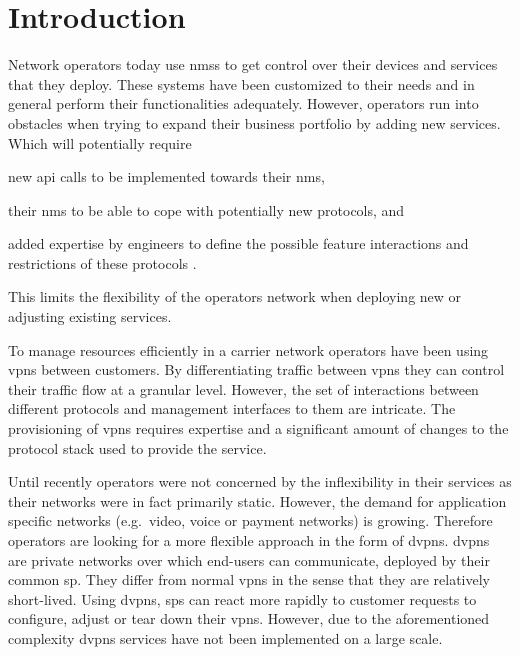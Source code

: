 \section{Introduction} %
\label{sec:introduction}
Network operators today use \acp{nms} to get control over their devices and services that they deploy. These systems have been customized to their needs and in general perform their functionalities adequately. However, operators run into obstacles when trying to expand their business portfolio by adding new services. Which will potentially require
\begin{inparaenum}
	\item new \ac{api} calls to be implemented towards their \ac{nms}, 
	\item their \ac{nms} to be able to cope with potentially new protocols, and
	\item added expertise by engineers to define the possible feature interactions and restrictions of these protocols \cite{programmability-answer}. 
\end{inparaenum}
This limits the flexibility of the operators network when deploying new or adjusting existing services.



To manage resources efficiently in a carrier network operators have been using \acp{vpn} between customers. By differentiating traffic between \acp{vpn} they can control their traffic flow at a granular level. However, the set of interactions between different protocols and management interfaces to them are intricate. The provisioning of \acp{vpn} requires expertise and a significant amount of changes to the protocol stack used to provide the service. 

Until recently operators were not concerned by the inflexibility in their services as their networks were in fact primarily static. However, the demand for application specific networks (e.g.\ video, voice or payment networks) is growing. Therefore operators are looking for a more flexible approach in the form of \acp{dvpn}. \acp{dvpn} are private networks over which end-users can communicate, deployed by their common \ac{sp}. They differ from normal \acp{vpn} in the sense that they are relatively short-lived. Using \acp{dvpn}, \acp{sp} can react more rapidly to customer requests to configure, adjust or tear down their \acp{vpn}. However, due to the aforementioned complexity \acp{dvpn} services have not been implemented on a large scale.

